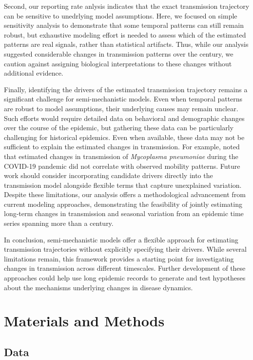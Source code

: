 \documentclass[12pt]{article}
\begin{document}
Second, our reporting rate anlysis indicates that the exact transmission trajectory can be sensitive to unedrlying model assumptions.
Here, we focused on simple sensitivity analysis to demonstrate that some temporal patterns can still remain robust, but exhaustive modeling effort is needed to assess which of the estimated patterns are real signals, rather than statistical artifacts.
Thus, while our analysis suggested considerable changes in transmission patterns over the century, we caution against assigning biological interpretations to these changes without additional evidence.

Finally, identifying the drivers of the estimated transmission trajectory remains a significant challenge for semi-mechanistic models.
Even when temporal patterns are robust to model assumptions, their underlying causes may remain unclear.
Such efforts would require detailed data on behavioral and demographic changes over the course of the epidemic, but gathering these data can be particularly challenging for historical epidemics.
Even when available, these data may not be sufficient to explain the estimated changes in transmission.
For example, \cite{park2024predicting} noted that estimated changes in transmission of \textit{Mycoplasma pneumoniae} during the COVID-19 pandemic did not correlate with observed mobility patterns.
Future work should consider incorporating candidate drivers directly into the transmission model alongside flexible terms that capture unexplained variation.
Despite these limitations, our analysis offers a methodological advancement from current modeling approaches, demonstrating the feasibility of jointly estimating long-term changes in transmission and seasonal variation from an epidemic time series spanning more than a century.

In conclusion, semi-mechanistic models offer a flexible approach for estimating transmission trajectories without explicitly specifying their drivers.
While several limitations remain, this framework provides a starting point for investigating changes in transmission across different timescales.
Further development of these approaches could help use long epidemic records to generate and test hypotheses about the mechanisms underlying changes in disease dynamics.

\section*{Materials and Methods}

\subsection*{Data}
\end{document}
